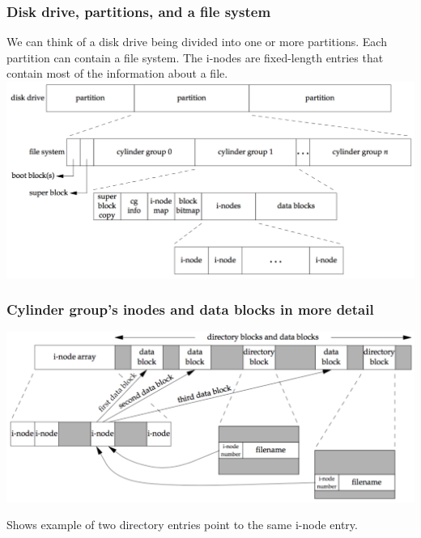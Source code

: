\documentclass[newPxFont,sthlmFooter,nooffset]{beamer}
\begin{document}
\begin{frame}
  \frametitle{Disk drive, partitions, and a file system}
We can think of a disk drive being divided into one or more partitions. Each partition can contain a file system. The i-nodes are fixed-length entries that contain most of the information about a file.
\includegraphics[width=\textwidth]{figure/fig4_13_disk.png}
\end{frame}



\begin{frame}
  \frametitle{Cylinder group's inodes and data blocks in more detail}
\includegraphics[width=\textwidth]{figure/fig4_14_cylinder.png}

Shows example of two directory entries point to the same i-node
  entry.
\end{frame}
\end{document}
